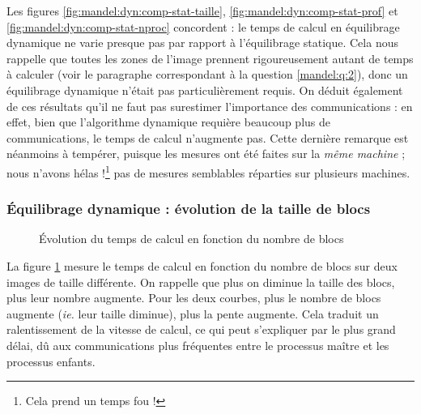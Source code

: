 Les figures \ref{fig:mandel:dyn:comp-stat-taille},
\ref{fig:mandel:dyn:comp-stat-prof} et
\ref{fig:mandel:dyn:comp-stat-nproc} concordent : le temps de calcul
en équilibrage dynamique ne varie presque pas par rapport à
l'équilibrage statique. Cela nous rappelle que toutes les zones de
l'image prennent rigoureusement autant de temps à calculer (voir le
paragraphe correspondant à la question \ref{mandel:q:2}), donc un
équilibrage dynamique n'était pas particulièrement requis. On déduit
également de ces résultats qu'il ne faut pas surestimer l'importance
des communications : en effet, bien que l'algorithme dynamique
requière beaucoup plus de communications, le temps de calcul
n'augmente pas. Cette dernière remarque est néanmoins à tempérer,
puisque les mesures ont été faites sur la \emph{même machine} ; nous
n'avons hélas !\footnote{Cela prend un temps fou !} pas de mesures
semblables réparties sur plusieurs machines.



\subsubsection{Équilibrage dynamique : évolution de la taille de blocs}


\begin{figure}
  \centering


  \caption{Évolution du temps de calcul en fonction du nombre de
    blocs}
  \label{fig:mandel:dyn:nblocks}
\end{figure}

La figure \ref{fig:mandel:dyn:nblocks} mesure le temps de calcul en
fonction du nombre de blocs sur deux images de taille différente. On
rappelle que plus on diminue la taille des blocs, plus leur nombre
augmente. Pour les deux courbes, plus le nombre de blocs augmente
(\emph{ie.} leur taille diminue), plus la pente augmente. Cela
traduit un ralentissement de la vitesse de calcul, ce qui peut
s'expliquer par le plus grand délai, dû aux communications plus
fréquentes entre le processus maître et les processus enfants.



